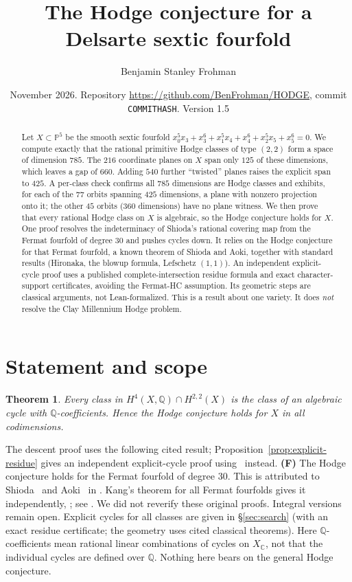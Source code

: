 \documentclass[11pt]{amsart}
\title{The Hodge conjecture for a Delsarte sextic fourfold}
\author{Benjamin Stanley Frohman}
\date{November 2026. Repository \url{https://github.com/BenFrohman/HODGE}, commit \texttt{COMMITHASH}. Version 1.5}
\newtheorem{theorem}{Theorem}[section]
\theoremstyle{remark}\newtheorem{remark}[theorem]{Remark}
\newcommand{\Q}{\mathbb{Q}}\newcommand{\PP}{\mathbb{P}}
\begin{document}
\begin{abstract}
Let $X\subset\PP^5$ be the smooth sextic fourfold
$x_0^5x_3+x_3^6+x_1^5x_4+x_4^6+x_2^5x_5+x_5^6=0$. We compute exactly that the rational
primitive Hodge classes of type $(2,2)$ form a space of dimension $785$. The $216$ coordinate
planes on $X$ span only $125$ of these dimensions, which leaves a gap of $660$. Adding $540$
further ``twisted'' planes raises the explicit span to $425$. A per-class check confirms all $785$ dimensions are Hodge classes and exhibits, for each of the $77$ orbits spanning $425$ dimensions, a plane with nonzero projection onto it; the other $45$ orbits ($360$ dimensions) have no plane witness. We then prove that every rational
Hodge class on $X$ is algebraic, so the Hodge conjecture holds for $X$. One proof resolves the
indeterminacy of Shioda's rational covering map from the Fermat fourfold of degree $30$ and
pushes cycles down. It relies on the Hodge conjecture for that Fermat fourfold, a known theorem
of Shioda and Aoki, together with standard results (Hironaka, the blowup formula, Lefschetz
$(1,1)$). An independent explicit-cycle proof uses a published complete-intersection residue formula and exact character-support certificates, avoiding the Fermat-HC assumption. Its geometric steps are classical arguments, not Lean-formalized. This is a result about one variety. It does \emph{not} resolve the Clay Millennium
Hodge problem.
\end{abstract}
\maketitle
{}\par


\section{Statement and scope}
\begin{theorem}\label{thm:main}
Every class in $H^4(X,\Q)\cap H^{2,2}(X)$ is the class of an algebraic cycle with $\Q$-coefficients.
Hence the Hodge conjecture holds for $X$ in all codimensions.
\end{theorem}
The descent proof uses the following cited result; Proposition~\ref{prop:explicit-residue} gives an independent explicit-cycle proof using~\cite{VL} instead.
\textbf{(F)} The Hodge conjecture holds for the Fermat fourfold of degree $30$. This is
attributed to Shioda~\cite{Shi79} and Aoki~\cite{Aok83} in \cite[\S1]{MMRV}. Kang's theorem
for all Fermat fourfolds gives it independently, \cite{Kan16}; see \cite[Rem.~3.9]{MMRV}.
We did not reverify these original proofs. Integral versions remain open. Explicit cycles for all
classes are given in \S\ref{sec:search} (with an exact residue certificate; the geometry uses cited classical theorems). Here $\Q$-coefficients mean rational linear combinations of cycles on $X_{\mathbb C}$, not that the individual cycles are defined over $\Q$. Nothing here bears on the general Hodge conjecture.
\end{document}
